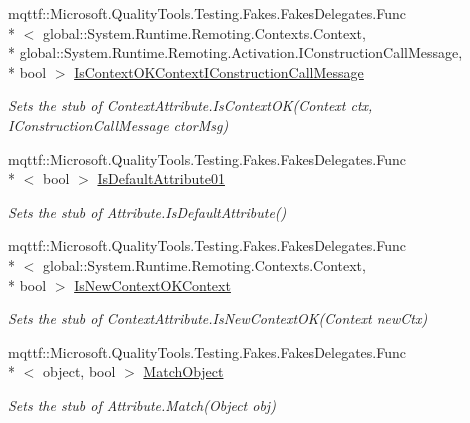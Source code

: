 \begin{DoxyCompactItemize}
mqttf\-::\-Microsoft.\-Quality\-Tools.\-Testing.\-Fakes.\-Fakes\-Delegates.\-Func\\*
$<$ global\-::\-System.\-Runtime.\-Remoting.\-Contexts.\-Context, \\*
global\-::\-System.\-Runtime.\-Remoting.\-Activation.\-I\-Construction\-Call\-Message, \\*
bool $>$ \hyperlink{class_system_1_1_runtime_1_1_remoting_1_1_contexts_1_1_fakes_1_1_stub_context_attribute_af60926687c34b0bd740fdd7997a24751}{Is\-Context\-O\-K\-Context\-I\-Construction\-Call\-Message}
\begin{DoxyCompactList}\small\item\em Sets the stub of Context\-Attribute.\-Is\-Context\-O\-K(\-Context ctx, I\-Construction\-Call\-Message ctor\-Msg)\end{DoxyCompactList}\item 
mqttf\-::\-Microsoft.\-Quality\-Tools.\-Testing.\-Fakes.\-Fakes\-Delegates.\-Func\\*
$<$ bool $>$ \hyperlink{class_system_1_1_runtime_1_1_remoting_1_1_contexts_1_1_fakes_1_1_stub_context_attribute_adb1ff4e7b39fd9751c2a4beb28ce5fc6}{Is\-Default\-Attribute01}
\begin{DoxyCompactList}\small\item\em Sets the stub of Attribute.\-Is\-Default\-Attribute()\end{DoxyCompactList}\item 
mqttf\-::\-Microsoft.\-Quality\-Tools.\-Testing.\-Fakes.\-Fakes\-Delegates.\-Func\\*
$<$ global\-::\-System.\-Runtime.\-Remoting.\-Contexts.\-Context, \\*
bool $>$ \hyperlink{class_system_1_1_runtime_1_1_remoting_1_1_contexts_1_1_fakes_1_1_stub_context_attribute_aa6edf2513457a1def47694e13cb8844b}{Is\-New\-Context\-O\-K\-Context}
\begin{DoxyCompactList}\small\item\em Sets the stub of Context\-Attribute.\-Is\-New\-Context\-O\-K(\-Context new\-Ctx)\end{DoxyCompactList}\item 
mqttf\-::\-Microsoft.\-Quality\-Tools.\-Testing.\-Fakes.\-Fakes\-Delegates.\-Func\\*
$<$ object, bool $>$ \hyperlink{class_system_1_1_runtime_1_1_remoting_1_1_contexts_1_1_fakes_1_1_stub_context_attribute_a7707e10cade24f424d8a6964cf18e7f8}{Match\-Object}
\begin{DoxyCompactList}\small\item\em Sets the stub of Attribute.\-Match(\-Object obj)\end{DoxyCompactList}\item 

\end{DoxyCompactItemize}
